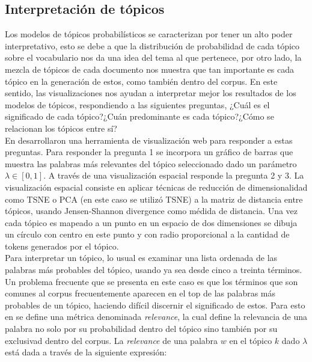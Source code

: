 \documentclass[letterpaper,12pt,oneside]{book} %
\begin{document}
\subsection{Interpretación de tópicos}

Los modelos de tópicos probabilísticos se caracterizan por tener un alto poder interpretativo, esto se debe a que la distribución de probabilidad de cada tópico sobre el vocabulario nos da una idea del tema al que pertenece, por otro lado, la mezcla de tópicos de cada documento nos muestra que tan importante es cada tópico en la generación de estos, como también dentro del corpus. En este sentido, las visualizaciones nos ayudan a interpretar mejor los resultados de los modelos de tópicos, respondiendo a las siguientes preguntas, ¿Cuál es el significado de cada tópico?¿Cuán predominante es cada tópico?¿Cómo se relacionan los tópicos entre sí?\\

En \citep{sievert2014ldavis} desarrollaron una herramienta de visualización web para responder a estas preguntas. Para responder la pregunta 1 se incorpora un gráfico de barras que muestra las palabras más relevantes del tópico seleccionado dado un parámetro $\lambda \in [0,1]$. A través de una visualización espacial responde la pregunta 2 y 3. La visualización espacial consiste en aplicar técnicas de reducción de dimensionalidad como TSNE \citep{maaten2008visualizing} o PCA \citep{wold1987principal} (en este caso se utilizó TSNE) a la matriz de distancia entre tópicos, usando Jensen-Shannon divergence \citep{endres2003new} como médida de distancia. Una vez cada tópico es mapeado a un punto en un espacio de dos dimensiones se dibuja un círculo con centro en este punto y con radio proporcional a la cantidad de tokens generados por el tópico.\\

Para interpretar un tópico, lo usual es examinar una lista ordenada de las palabras más probables del tópico, usando ya sea desde cinco a treinta términos. Un problema frecuente que se presenta en este caso es que los términos que son comunes al corpus frecuentemente aparecen en el top de las palabras más probables de un tópico, haciendo difícil discernir el significado de estos.
Para esto en \citep{sievert2014ldavis} se define una métrica denominada \textit{relevance}, la cual define la relevancia de una palabra no solo por su probabilidad dentro del tópico sino también por su exclusivad dentro del corpus. La \textit{relevance} de una palabra $w$ en el tópico $k$ dado $\lambda$ está dada a través de la siguiente expresión:
\end{document}
